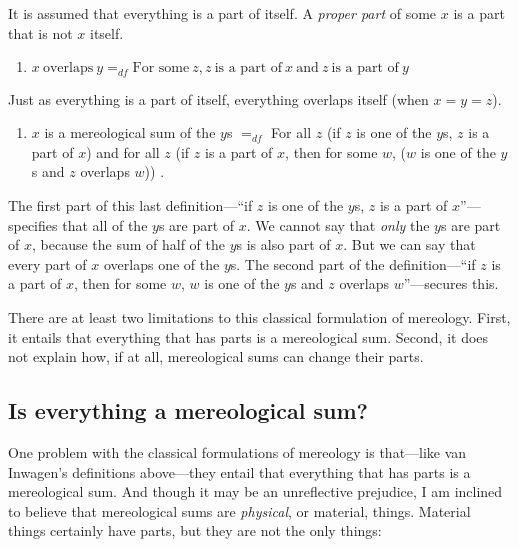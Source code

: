 \documentclass[12pt,twoside]{reedfancy}
\begin{document}
\begin{spacing}{1.25}
It is assumed that everything is a part of itself.  A {\em proper
  part} of some $x$ is a part that is not $x$ itself.

\begin{enumerate}[start=2]
  \item $x\ \text{overlaps}\ y =_{df} \text{For some}\ z, z\ \text{is
    a part of}\ x\ \text{and}\ z\ \text{is a part of}\ y$
\end{enumerate}

Just as everything is a part of itself, everything overlaps itself
(when $x = y = z$).

\begin{enumerate}[start=3]
  \item $x$ is a mereological sum of the $y$s $=_{df}$ For all $z$ (if
    $z$ is one of the $y$s, $z$ is a part of $x$) and for all $z$ (if
    $z$ is a part of $x$, then for some $w$, ($w$ is one of the $y$s
    and $z$ overlaps $w$)) \citeyearpar[618--619]{inwagen2006}.
\end{enumerate}

The first part of this last definition---``if $z$ is one of the $y$s,
$z$ is a part of $x$''---specifies that all of the $y$s are part of
$x$.  We cannot say that {\em only} the $y$s are part of $x$, because
the sum of half of the $y$s is also part of $x$.  But we can say that
every part of $x$ overlaps one of the $y$s.  The second part of the
definition---``if $z$ is a part of $x$, then for some $w$, $w$ is one
of the $y$s and $z$ overlaps $w$''---secures this.

There are at least two limitations to this classical formulation of
mereology.  First, it entails that everything that has parts is a
mereological sum.  Second, it does not explain how, if at all,
mereological sums can change their parts.

\subsection{Is everything a mereological sum?}
\label{all-sum}
One problem with the classical formulations of mereology is
that---like van Inwagen's definitions above---they entail that
everything that has parts is a mereological sum.  And though it may be
an unreflective prejudice, I am inclined to believe that mereological
sums are {\em physical}, or material, things.  Material things
certainly have parts, but they are not the only things:


\end{spacing}
\end{document}
